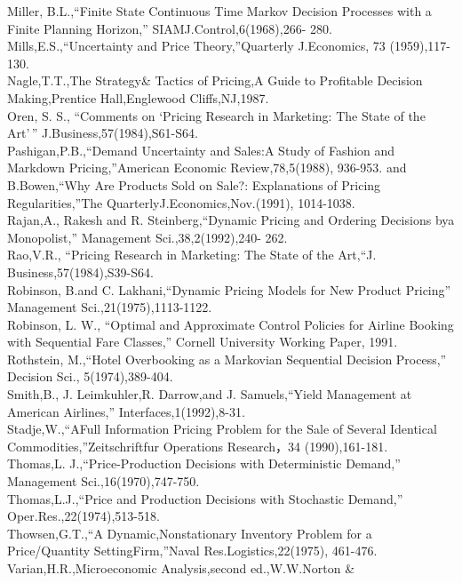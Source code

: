 Miller, B.L.,``Finite State Continuous Time Markov Decision Processes
with a Finite Planning Horizon,'' SIAMJ.Control,6(1968),266- 280.\\
Mills,E.S.,``Uncertainty and Price Theory,''Quarterly J.Economics, 73
(1959),117-130.\\
Nagle,T.T.,The Strategy\& Tactics of Pricing,A Guide to Profitable
Decision Making,Prentice Hall,Englewood Cliffs,NJ,1987.\\
Oren, S. S., ``Comments on `Pricing Research in Marketing: The State of
the Art'\,'' J.Business,57(1984),S61-S64.\\
Pashigan,P.B.,``Demand Uncertainty and Sales:A Study of Fashion and
Markdown Pricing,''American Economic Review,78,5(1988), 936-953. and
B.Bowen,``Why Are Products Sold on Sale?: Explanations of Pricing
Regularities,''The QuarterlyJ.Economics,Nov.(1991), 1014-1038.\\
Rajan,A., Rakesh and R. Steinberg,``Dynamic Pricing and Ordering
Decisions bya Monopolist,'' Management Sci.,38,2(1992),240- 262.\\
Rao,V.R., ``Pricing Research in Marketing: The State of the Art,``J.
Business,57(1984),S39-S64.\\
Robinson, B.and C. Lakhani,``Dynamic Pricing Models for New Product
Pricing'' Management Sci.,21(1975),1113-1122.\\
Robinson, L. W., ``Optimal and Approximate Control Policies for Airline
Booking with Sequential Fare Classes,'' Cornell University Working
Paper, 1991.\\
Rothstein, M.,``Hotel Overbooking as a Markovian Sequential Decision
Process,'' Decision Sci., 5(1974),389-404.\\
Smith,B., J. Leimkuhler,R. Darrow,and J. Samuels,``Yield Management at
American Airlines,'' Interfaces,1(1992),8-31.\\
Stadje,W.,``AFull Information Pricing Problem for the Sale of Several
Identical Commodities,''Zeitschriftfur Operations Research，34
(1990),161-181.\\
Thomas,L. J.,``Price-Production Decisions with Deterministic Demand,''
Management Sci.,16(1970),747-750.\\
Thomas,L.J.,``Price and Production Decisions with Stochastic Demand,''
Oper.Res.,22(1974),513-518.\\
Thowsen,G.T.,``A Dynamic,Nonstationary Inventory Problem for a
Price/Quantity SettingFirm,''Naval Res.Logistics,22(1975), 461-476.\\
Varian,H.R.,Microeconomic Analysis,second ed.,W.W.Norton \&
